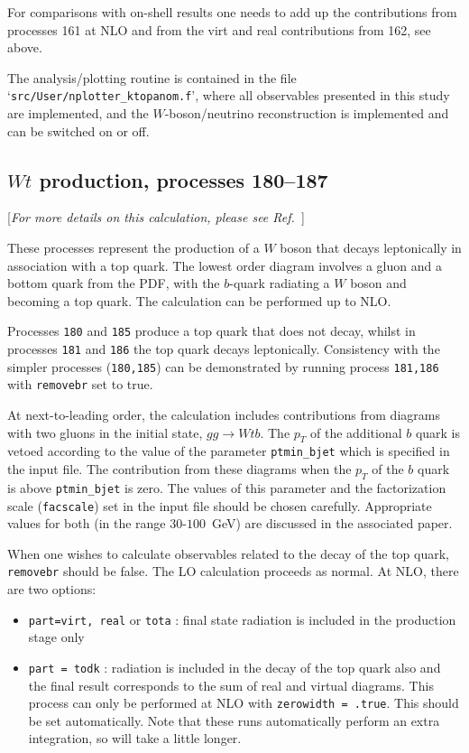 For comparisons with on-shell results one needs to add up the contributions
from processes 161 at NLO and from the virt and real contributions from 162, see above.

The analysis/plotting routine is contained in the file
`\texttt{src/User/nplotter\_ktopanom.f}', where all observables
presented in this study are implemented, and the $W$-boson/neutrino
reconstruction is implemented and can be switched on or off.

\subsection{$Wt$ production, processes 180--187}
\label{subsec:wt}

\begin{center}
[{\it For more details on this calculation, please see Ref.~\cite{Campbell:2005bb}}]
\end{center}

These processes represent the production of a $W$ boson that decays leptonically
in association with a top quark. The lowest order diagram involves a gluon and
a bottom quark from the PDF, with the $b$-quark radiating a $W$ boson and
becoming a top quark. The calculation can be performed up to NLO.

Processes {\tt 180} and {\tt 185} produce a top quark that does not decay,
whilst in processes {\tt 181} and {\tt 186} the top quark decays leptonically.
Consistency with
the simpler processes ({\tt 180,185}) can be demonstrated by running process
{\tt 181,186} with {\tt removebr} set to true.

At next-to-leading order, the calculation includes contributions from diagrams
with two gluons in the initial state, $gg \rightarrow Wtb$. The $p_T$ of the
additional $b$ quark is vetoed according to the value of the parameter
{\tt ptmin\_bjet} which is specified in the input file. The contribution from
these diagrams when the $p_T$ of the $b$ quark is above {\tt ptmin\_bjet}
is zero. The values of this parameter and the factorization scale ({\tt facscale})
set in the input file should be chosen carefully. Appropriate values for both
(in the range $30$-$100$~GeV) are discussed in the associated paper.

When one wishes to calculate observables related to the decay of the top
quark, {\tt removebr} should be false.
The LO calculation proceeds as normal. At NLO, there are two options:
\begin{itemize}
\item {\tt part=virt, real} or {\tt tota} : final state radiation is included
in the production stage only
\item {\tt part = todk} : radiation is included in the decay of the top
quark also and the final result corresponds to the sum of real and virtual
diagrams. This process can only be performed at NLO with 
{\tt zerowidth = .true}. This should be set automatically.
Note that these runs automatically perform an extra integration, so
will take a little longer.
\end{itemize}

